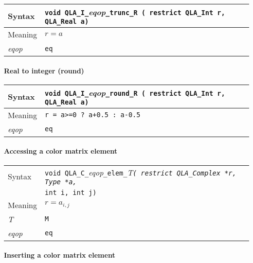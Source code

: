 \documentclass{article}
\newcommand{\tReal}{QLA\ttdash Real }
\newcommand{\tComplex}{QLA\ttdash Complex }
\newcommand{\tInt}{QLA\ttdash Int }
\newcommand{\namespace}{QLA}
\newcommand{\ttdash}{{\tt \_}}
\newcommand{\itt}{\it T}
\newcommand{\extraarg}{}
\begin{document}
\begin{flushleft}
  \begin{tabular}{|l|l|}
  \hline
  Syntax      & {\tt void \namespace}\ttdash{\tt I}\ttdash{\it eqop}\ttdash{\tt trunc}\ttdash{\tt R ( restrict \tInt }{\tt *r, \tReal }{\tt *a\extraarg)}\\
  \hline
  Meaning     & $r = a$ \\
  \hline
  {\it eqop}  & {\tt eq} \\
  \hline
  \end{tabular}
\end{flushleft}

\paragraph{Real to integer (round)}

\begin{flushleft}
  \begin{tabular}{|l|l|}
  \hline
  Syntax      & {\tt void \namespace}\ttdash{\tt I}\ttdash{\it eqop}\ttdash{\tt round}\ttdash{\tt R ( restrict \tInt }{\tt *r, \tReal }{\tt *a\extraarg)}\\
  \hline
  Meaning     & {\tt r = a>=0 ? a+0.5 : a-0.5} \\
  \hline
  {\it eqop}  & {\tt eq} \\
  \hline
  \end{tabular}
\end{flushleft}

\paragraph{Accessing a color matrix element}

\begin{flushleft}
  \begin{tabular}{|l|l|}
  \hline
  Syntax      & {\tt void \namespace}\ttdash{\tt C}\ttdash{\it eqop}\ttdash{\tt elem}\ttdash\itt{\tt ( restrict \tComplex *r, Type *a,}\\
              & {\tt int i, int j\extraarg)} \\
  \hline
  Meaning     & $r = a_{i,j}$\\
  \hline
  \itt        & {\tt M} \\
  \hline
  {\it eqop}  & {\tt eq} \\
  \hline
  \end{tabular}
\end{flushleft}

\paragraph{Inserting a color matrix element}
\end{document}
